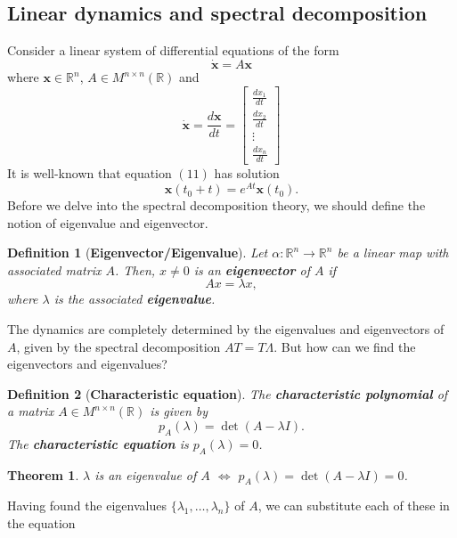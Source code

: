 \documentclass[]{article}
\newtheorem{definition}{Definition}
\newtheorem{theorem}{Theorem}
\begin{document}
\subsection{Linear dynamics and spectral decomposition}
Consider a linear system of differential equations of the form
\begin{equation}
	\dot{\textbf{x}}=A\textbf{x}	
\end{equation}
where $\textbf{x} \in \mathbb{R}^n$, $A \in M^{n \times n}(\mathbb{R})$ and
\begin{equation}
	\dot{\textbf{x}}=\frac{d\textbf{x}}{dt}=\begin{bmatrix}
		\frac{dx_1}{dt} \\
		\frac{dx_2}{dt} \\
		\vdots \\
		\frac{dx_n}{dt}
	\end{bmatrix}
\end{equation}
It is well-known that equation $(11)$ has solution
\begin{equation}
	\textbf{x}(t_0+t)=e^{At}\textbf{x}(t_0).
\end{equation}
Before we delve into the spectral decomposition theory, we should define the notion of eigenvalue and eigenvector.
\begin{definition}[\textbf{Eigenvector/Eigenvalue}]
Let $\alpha: \mathbb{R}^n \to \mathbb{R}^n$ be a linear map with associated matrix $A$. Then, $x \neq 0$ is an \textbf{eigenvector} of $A$ if
\begin{equation}
	Ax=\lambda x,
\end{equation}
where $\lambda$ is the associated \textbf{eigenvalue}.
\end{definition}
The dynamics are completely determined by the eigenvalues and eigenvectors of $A$, given by the spectral decomposition $AT=T\Lambda$. But how can we find the eigenvectors and eigenvalues?
\begin{definition}[\textbf{Characteristic equation}]
The \textbf{characteristic polynomial} of a matrix $A \in M^{n \times n}(\mathbb{R})$ is given by
\begin{equation}
	p_A(\lambda)=\det(A-\lambda I).
\end{equation}
The \textbf{characteristic equation} is $p_A(\lambda)=0$.
\end{definition}
\begin{theorem}
$\lambda$ is an eigenvalue of $A$ $\iff$ $p_A(\lambda)=\det(A-\lambda I)=0$.
\end{theorem}
Having found the eigenvalues $\{\lambda_1,\dots,\lambda_n\}$ of $A$, we can substitute each of these in the equation 
\end{document}
